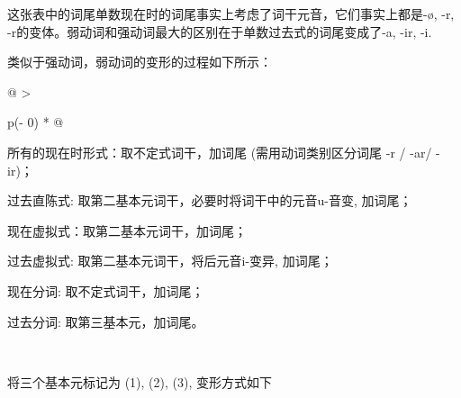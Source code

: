 这张表中的词尾单数现在时的词尾事实上考虑了词干元音，它们事实上都是-ø,
-r, -r的变体。弱动词和强动词最大的区别在于单数过去式的词尾变成了-a, -ir,
-i.

类似于强动词，弱动词的变形的过程如下所示：

\begin{longtable}[]{@{}
  >{\raggedright\arraybackslash}p{(\columnwidth - 0\tabcolsep) * }@{}}
\toprule\noalign{}
\begin{minipage}[b]{\linewidth}\raggedright
所有的现在时形式：取不定式词干，加词尾 (需用动词类别区分词尾 -r / -ar/
-ir)；

过去直陈式: 取第二基本元词干，必要时将词干中的元音u-音变, 加词尾；

现在虚拟式：取第二基本元词干，加词尾；

过去虚拟式: 取第二基本元词干，将后元音i-变异, 加词尾；

现在分词: 取不定式词干，加词尾；

过去分词: 取第三基本元，加词尾。
\end{minipage} \\
\midrule\noalign{}
\endhead
\bottomrule\noalign{}
\endlastfoot
\end{longtable}

将三个基本元标记为 (1), (2), (3), 变形方式如下

